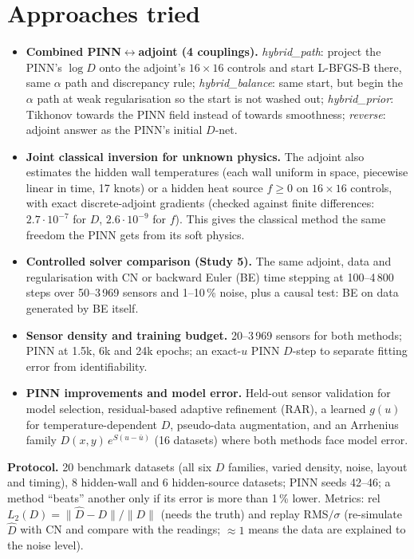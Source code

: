 \documentclass[10pt,a4paper]{article}
\begin{document}
\section{Approaches tried}
\begin{itemize}
\item \textcolor{joint}{\textbf{Combined PINN$\leftrightarrow$adjoint (4 couplings).}} \emph{hybrid\_path}: project the
PINN's $\log D$ onto the adjoint's $16\times16$ controls and start L-BFGS-B there, same $\alpha$ path and discrepancy
rule; \emph{hybrid\_balance}: same start, but begin the $\alpha$ path at weak regularisation so the start is not
washed out; \emph{hybrid\_prior}: Tikhonov towards the PINN field instead of towards smoothness; \emph{reverse}:
adjoint answer as the PINN's initial $D$-net.
\item \textcolor{joint}{\textbf{Joint classical inversion for unknown physics.}} The adjoint also estimates the
hidden wall temperatures (each wall uniform in space, piecewise linear in time, 17 knots) or a hidden heat source $f\ge0$ on $16\times16$ controls, with exact
discrete-adjoint gradients (checked against finite differences: $2.7\cdot10^{-7}$ for $D$, $2.6\cdot10^{-9}$ for $f$).
This gives the classical method the same freedom the PINN gets from its soft physics.
\item \textbf{Controlled solver comparison (Study 5).} The same adjoint, data and regularisation with CN or backward
Euler (BE) time stepping at 100--4\,800 steps over 50--3\,969 sensors and 1--10\,\% noise, plus a causal test: BE on
data generated by BE itself.
\item \textbf{Sensor density and training budget.} 20--3\,969 sensors for both methods; PINN at 1.5k, 6k and 24k epochs;
an exact-$u$ PINN $D$-step to separate fitting error from identifiability.
\item \textbf{PINN improvements and model error.} Held-out sensor validation for model selection, residual-based
adaptive refinement (RAR), a learned $g(u)$ for temperature-dependent $D$, pseudo-data augmentation, and an
Arrhenius family $D(x,y)\,e^{S(u-\bar u)}$ (16 datasets) where both methods face model error.
\end{itemize}
\textbf{Protocol.} 20 benchmark datasets (all six $D$ families, varied density, noise, layout and timing),
8 hidden-wall and 6 hidden-source datasets; PINN seeds 42--46; a method ``beats'' another only if its error is
more than 1\,\% lower. Metrics: rel$L_2(D)=\lVert\hat D-D\rVert/\lVert D\rVert$ (needs the truth) and replay
RMS$/\sigma$ (re-simulate $\hat D$ with CN and compare with the readings; $\approx1$ means the data are explained to the
noise level).
\end{document}
